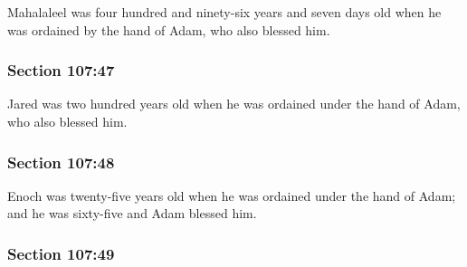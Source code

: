 		Mahalaleel was four hundred and ninety-six years and seven days old when he was ordained by the hand of Adam, who also blessed him.


	\subsubsection{Section 107:47} %
		\label{DC107-47}

		Jared was two hundred years old when he was ordained under the hand of Adam, who also blessed him.


	\subsubsection{Section 107:48} %
		\label{DC107-48}

		Enoch was twenty-five years old when he was ordained under the hand of Adam; and he was sixty-five and Adam blessed him.


	\subsubsection{Section 107:49} %
		\label{DC107-49}

